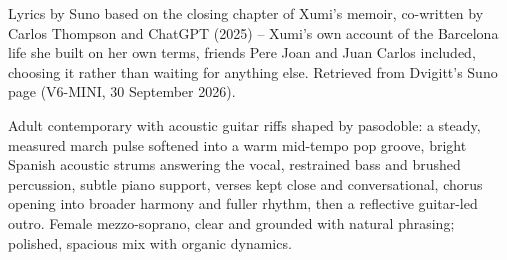 
\begin{notes}
Lyrics by Suno based on the closing chapter of Xumi's memoir, co-written by Carlos Thompson and ChatGPT (2025) -- Xumi's own account of the Barcelona life she built on her own terms, friends Pere Joan and Juan Carlos included, choosing it rather than waiting for anything else. Retrieved from Dvigitt's Suno page (V6-MINI, 30 September 2026).
\end{notes}
\begin{style}
Adult contemporary with acoustic guitar riffs shaped by pasodoble: a steady, measured march pulse softened into a warm mid-tempo pop groove, bright Spanish acoustic strums answering the vocal, restrained bass and brushed percussion, subtle piano support, verses kept close and conversational, chorus opening into broader harmony and fuller rhythm, then a reflective guitar-led outro. Female mezzo-soprano, clear and grounded with natural phrasing; polished, spacious mix with organic dynamics.
\end{style}
